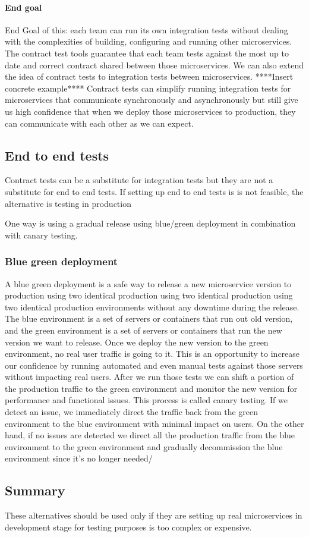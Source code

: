 \paragraph{End goal}
End Goal of this: each team can run its own integration tests without dealing with the complexities of building, configuring and running other microservices.
The contract test tools guarantee that each team tests against the most up to date and correct contract shared between those microservices.
We can also extend the idea of contract tests to integration tests between microservices. ****Insert concrete example****
Contract tests can simplify running integration tests for microservices that communicate synchronously and asynchronously but still give us high confidence that when we deploy those microservices to production, they can communicate with each other as we can expect.

\subsection{End to end tests}
Contract tests can be a substitute for integration tests but they are not a substitute for end to end tests.
If setting up end to end tests is is not feasible, the alternative is testing in production

One way is using a gradual release using blue/green deployment in combination with canary testing.

\subsubsection{Blue green deployment}
A blue green deployment is a safe way to release a new microservice version to production using two identical production using two identical production using two identical production environments without any downtime during the release.
The blue environment is a set of servers or containers that run out old version, and the green environment is a set of servers or containers that run the new version we want to release.
Once we deploy the new version to the green environment, no real user traffic is going to it.
This is an opportunity to increase our confidence by running automated and even manual tests against those servers without impacting real users.
After we run those tests we can shift a portion of the production traffic to the green environment and monitor the new version for performance and functional issues.
This process is called canary testing.
If we detect an issue, we immediately direct the traffic back from the green environment to the blue environment with minimal impact on users.
On the other hand, if no issues are detected we direct all the production traffic from the blue environment to the green environment and gradually decommission the blue environment since it's no longer needed/

\subsection{Summary}

These alternatives should be used only if they are setting up real microservices in development stage for testing purposes is too complex or expensive.